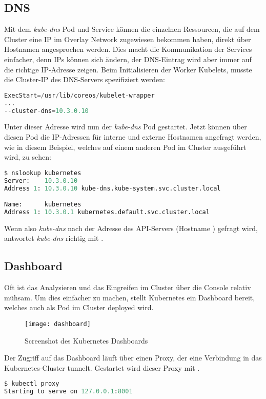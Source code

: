 \subsection{DNS}
Mit dem \emph{kube-dns} Pod und Service können die einzelnen Ressourcen, die
auf dem Cluster eine IP im Overlay Network zugewiesen bekommen haben, direkt über
Hostnamen angesprochen werden. Dies macht die Kommunikation der Services einfacher,
denn IPs können sich ändern, der DNS-Eintrag wird aber immer auf die richtige
IP-Adresse zeigen.
Beim Initialisieren der Worker Kubelets, musste die Cluster-IP des
DNS-Servers spezifiziert
werden:
\begin{lstlisting}[language=Python,numbers=none]
ExecStart=/usr/lib/coreos/kubelet-wrapper
...
--cluster-dns=10.3.0.10\end{lstlisting}
Unter dieser Adresse wird nun der \emph{kube-dns} Pod gestartet. Jetzt können über
diesen Pod
die IP-Adressen für interne und externe Hostnamen angefragt werden, wie in
diesem Beispiel, welches auf einem
anderen Pod im Cluster ausgeführt wird, zu sehen:
\begin{lstlisting}[language=Python,numbers=none]
$ nslookup kubernetes
Server:    10.3.0.10
Address 1: 10.3.0.10 kube-dns.kube-system.svc.cluster.local

Name:      kubernetes
Address 1: 10.3.0.1 kubernetes.default.svc.cluster.local\end{lstlisting}
Wenn also \emph{kube-dns} nach der Adresse des API-Servers
(Hostname ) gefragt wird,
antwortet \emph{kube-dns} richtig mit .

\subsection{Dashboard}
Oft ist das Analysieren und das Eingreifen im Cluster über die Console
relativ mühsam.
Um dies einfacher zu machen, stellt Kubernetes ein Dashboard bereit,
welches auch als Pod im Cluster deployed wird.

\begin{figure}[H]
\centering
\texttt{[image: dashboard]}
\caption{Screenshot des Kubernetes Dashboards}
\end{figure}

Der Zugriff auf das Dashboard läuft über einen Proxy, der eine Verbindung
in das Kubernetes-Cluster tunnelt.
Gestartet wird dieser Proxy mit .
\begin{lstlisting}[language=Python,numbers=none]
$ kubectl proxy
Starting to serve on 127.0.0.1:8001\end{lstlisting}

